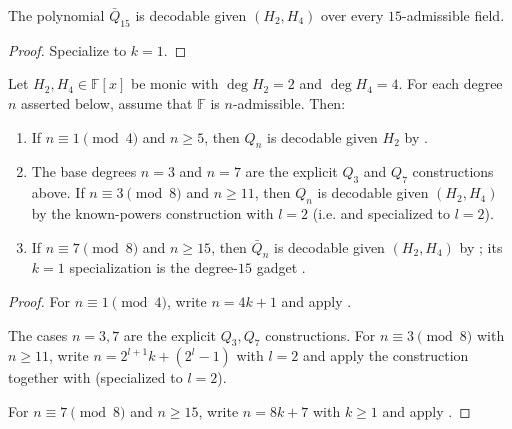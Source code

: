 \begin{corollary}\label{lem:barQ15}
    The polynomial $\bar Q_{15}$ is decodable given $(H_2,H_4)$ over every
    $15$-admissible field.
\end{corollary}
\begin{proof}
    Specialize  to $k=1$.
\end{proof}

\begin{lemma}\label{lem:odd-gadgets-H2H4}
    Let $H_2,H_4\in\mathbb{F}[x]$ be monic with $\deg H_2=2$ and $\deg H_4=4$.
    For each degree $n$ asserted below, assume that $\mathbb F$ is
    $n$-admissible.
    Then:
    \begin{enumerate}
        \item If $n\equiv 1\pmod 4$ and $n\ge 5$, then $Q_n$ is decodable given $H_2$ by .
        \item The base degrees $n=3$ and $n=7$ are the explicit $Q_3$ and
        $Q_7$ constructions above.  If
        $n\equiv 3\pmod 8$ and $n\ge 11$, then $Q_n$ is decodable given
        $(H_2,H_4)$ by the known-powers construction with $l=2$ (i.e.
         and 
        specialized to $l=2$).
        \item If $n\equiv 7\pmod 8$ and $n\ge 15$, then $\bar Q_n$ is
        decodable given $(H_2,H_4)$ by ; its $k=1$
        specialization is the degree-$15$ gadget
        .
    \end{enumerate}
\end{lemma}
\begin{proof}
    For $n\equiv 1\pmod 4$, write $n=4k+1$ and apply .

    The cases $n=3,7$ are the explicit $Q_3,Q_7$ constructions.  For
    $n\equiv 3\pmod 8$
    with $n\ge11$, write $n=2^{l+1}k+(2^l-1)$ with $l=2$ and apply the
    construction  together with
     (specialized to $l=2$).

    For $n\equiv 7\pmod 8$ and $n\ge 15$, write $n=8k+7$ with $k\ge1$
    and apply .
\end{proof}

